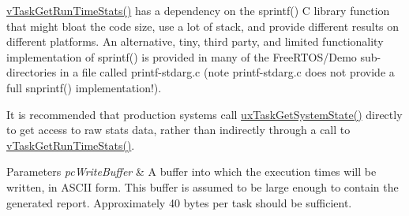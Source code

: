 \hyperlink{task_8h_a52da9b427041a48dc9f6802e10f151d4}{v\+Task\+Get\+Run\+Time\+Stats()} has a dependency on the sprintf() C library function that might bloat the code size, use a lot of stack, and provide different results on different platforms. An alternative, tiny, third party, and limited functionality implementation of sprintf() is provided in many of the Free\+R\+T\+O\+S/\+Demo sub-\/directories in a file called printf-\/stdarg.\+c (note printf-\/stdarg.\+c does not provide a full snprintf() implementation!).

It is recommended that production systems call \hyperlink{task_8h_aa4603f3de3d809e9beb18d10fbac005d}{ux\+Task\+Get\+System\+State()} directly to get access to raw stats data, rather than indirectly through a call to \hyperlink{task_8h_a52da9b427041a48dc9f6802e10f151d4}{v\+Task\+Get\+Run\+Time\+Stats()}.


\begin{DoxyParams}{Parameters}
{\em pc\+Write\+Buffer} & A buffer into which the execution times will be written, in A\+S\+C\+II form. This buffer is assumed to be large enough to contain the generated report. Approximately 40 bytes per task should be sufficient. \\
\hline
\end{DoxyParams}
